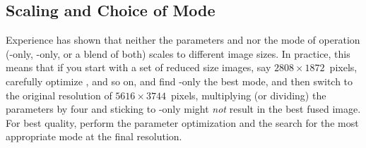 \subsection[Scaling and Choice of Mode]{\label{sec:scaling-and-choice}%
  Scaling and Choice of Mode}

Experience has shown that neither the parameters  and  nor
the mode of operation (-only, -only, or a blend of both) scales to
different image sizes.  In practice, this means that if you start with a set of reduced size
images, say $2808 \times 1872$~pixels, carefully optimize ,
 and so on, and find -only the best mode, and then switch to the
original resolution of $5616 \times 3744$~pixels, multiplying (or dividing) the parameters by
four and sticking to -only might \emph{not} result in the best fused image.  For
best quality, perform the parameter optimization and the search for the most appropriate mode at
the final resolution.


